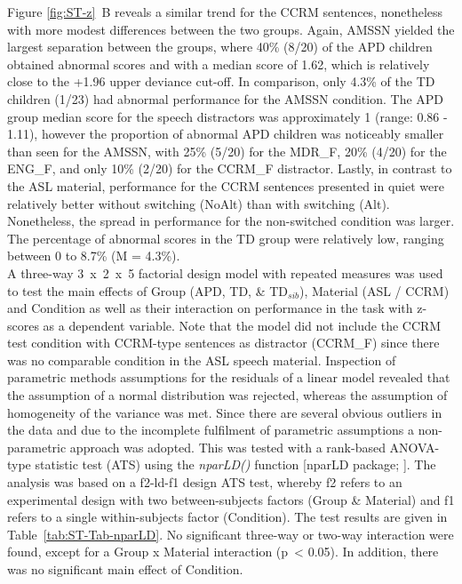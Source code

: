 \documentclass[a4paper, twoside]{templates/ociamthesis}
\begin{document}
\hfill\break
Figure \ref{fig:ST-z}~B reveals a similar trend for the CCRM sentences, nonetheless with more modest differences between the two groups. Again, AMSSN yielded the largest separation between the groups, where 40\% (8/20) of the APD children obtained abnormal scores and with a median score of 1.62, which is relatively close to the +1.96 upper deviance cut-off. In comparison, only 4.3\% of the TD children (1/23) had abnormal performance for the AMSSN condition. The APD group median score for the speech distractors was approximately 1 (range: 0.86 - 1.11), however the proportion of abnormal APD children was noticeably smaller than seen for the AMSSN, with 25\% (5/20) for the MDR\_F, 20\% (4/20) for the ENG\_F, and only 10\% (2/20) for the CCRM\_F distractor. Lastly, in contrast to the ASL material, performance for the CCRM sentences presented in quiet were relatively better without switching (NoAlt) than with switching (Alt). Nonetheless, the spread in performance for the non-switched condition was larger. The percentage of abnormal scores in the TD group were relatively low, ranging between 0 to 8.7\% (M = 4.3\%).\\

A three-way 3~x~2~x~5 factorial design model with repeated measures was used to test the main effects of Group (APD, TD, \& TD\(_{sib}\)), Material (ASL / CCRM) and Condition as well as their interaction on performance in the task with z-scores as a dependent variable. Note that the model did not include the CCRM test condition with CCRM-type sentences as distractor (CCRM\_F) since there was no comparable condition in the ASL speech material. Inspection of parametric methods assumptions for the residuals of a linear model revealed that the assumption of a normal distribution was rejected, whereas the assumption of homogeneity of the variance was met. Since there are several obvious outliers in the data and due to the incomplete fulfilment of parametric assumptions a non-parametric approach was adopted. This was tested with a rank-based ANOVA-type statistic test (ATS) using the \emph{nparLD()} function {[}nparLD package; \textcite{nparLDPackageR}{]}. The analysis was based on a f2-ld-f1 design ATS test, whereby f2 refers to an experimental design with two between-subjects factors (Group \& Material) and f1 refers to a single within-subjects factor (Condition). The test results are given in Table~\ref{tab:ST-Tab-nparLD}. No significant three-way or two-way interaction were found, except for a Group x Material interaction (p~\textless{} 0.05). In addition, there was no significant main effect of Condition.\\
\end{document}
